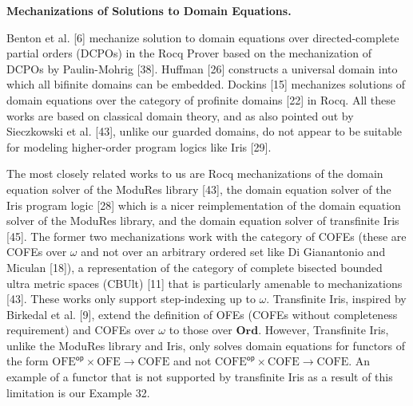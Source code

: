  
 
 
\par\medskip\noindent\textbf{Mechanizations of Solutions to Domain Equations.}\par
 
 
Benton et al. [6] mechanize solution to domain equations over directed-complete partial orders (DCPOs) in the Rocq Prover based on the mechanization of DCPOs by Paulin-Mohrig [38]. Huffman [26] constructs a universal domain into which all bifinite domains can be embedded. Dockins [15] mechanizes solutions of domain equations over the category of profinite domains [22] in Rocq. All these works are based on classical domain theory, and as also pointed out by Sieczkowski et al. [43], unlike our guarded domains, do not appear to be suitable for modeling higher-order program logics like Iris [29].\par
 
 
 
The most closely related works to us are Rocq mechanizations of the domain equation solver of the ModuRes library [43], the domain equation solver of the Iris program logic [28] which is a nicer reimplementation of the domain equation solver of the ModuRes library, and the domain equation solver of transfinite Iris [45]. The former two mechanizations work with the category of COFEs (these are COFEs over $\omega$ and not over an arbitrary ordered set like Di Gianantonio and Miculan [18]), a representation of the category of complete bisected bounded ultra metric spaces (CBUlt) [11] that is particularly amenable to mechanizations [43]. These works only support step-indexing up to $\omega$. Transfinite Iris, inspired by Birkedal et al. [9], extend the definition of OFEs (COFEs without completeness requirement) and COFEs over $\omega$ to those over $\mathbf{Ord}$. However, Transfinite Iris, unlike the ModuRes library and Iris, only solves domain equations for functors of the form ${\mathrm{OFE}}^{\mathsf{op}}\times\mathrm{OFE}\to\mathrm{COFE}$ and not ${\mathrm{COFE}}^{\mathsf{op}}\times\mathrm{COFE}\to\mathrm{COFE}$. An example of a functor that is not supported by transfinite Iris as a result of this limitation is our Example 32.\par
 
